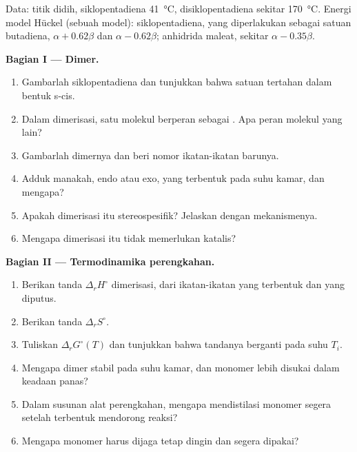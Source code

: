 \begin{problem}
\label{pb:b2:frontier-orbitals:1}
Data: titik didih, siklopentadiena \qty{41}{\degreeCelsius},
disiklopentadiena sekitar \qty{170}{\degreeCelsius}. Energi model Hückel
(sebuah model): siklopentadiena, yang diperlakukan sebagai satuan
butadiena,  $\alpha + 0.62\beta$ dan  $\alpha - 0.62\beta$; anhidrida
maleat,  sekitar $\alpha - 0.35\beta$.

\medskip
\noindent\textbf{Bagian I --- Dimer.}
\begin{enumerate}
  \item Gambarlah siklopentadiena dan tunjukkan bahwa satuan 
        tertahan dalam bentuk s-cis.
  \item Dalam dimerisasi, satu molekul berperan sebagai . Apa peran
        molekul yang lain?
  \item Gambarlah dimernya dan beri nomor ikatan-ikatan barunya.
  \item Adduk manakah, endo atau exo, yang terbentuk pada suhu kamar, dan
        mengapa?
  \item Apakah dimerisasi itu stereospesifik? Jelaskan dengan mekanismenya.
  \item Mengapa dimerisasi itu tidak memerlukan katalis?
\end{enumerate}

\medskip
\noindent\textbf{Bagian II --- Termodinamika perengkahan.}
\begin{enumerate}[resume]
  \item Berikan tanda $\Delta_r H^\circ$ dimerisasi, dari ikatan-ikatan yang
        terbentuk dan yang diputus.
  \item Berikan tanda $\Delta_r S^\circ$.
  \item Tuliskan $\Delta_r G^\circ(T)$ dan tunjukkan bahwa tandanya berganti
        pada suhu $T_i$.
  \item Mengapa dimer stabil pada suhu kamar, dan monomer lebih disukai
        dalam keadaan panas?
  \item Dalam susunan alat perengkahan, mengapa mendistilasi monomer segera
        setelah terbentuk mendorong reaksi?
  \item Mengapa monomer harus dijaga tetap dingin dan segera dipakai?
\end{enumerate}


\end{problem}
